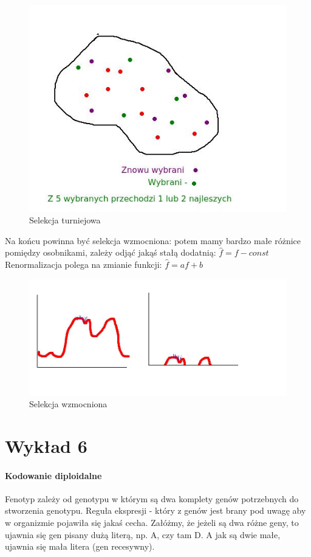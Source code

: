 \documentclass{article}
\begin{document}
				\begin{figure}[ht]
					\label{fig:fig2}
					\centering
					\includegraphics[scale=0.5]{selekcja_turniejowa.jpeg}
					\caption{Selekcja turniejowa}
				\end{figure}
				
			Na końcu powinna być selekcja wzmocniona: potem mamy bardzo małe różnice pomiędzy osobnikami, zależy odjąć jakąś stałą dodatnią: $\hat{f}=f-const$
			Renormalizacja polega na zmianie funkcji: $\hat{f} = af+b$
			
						\begin{figure}[ht]
							\label{fig:fig1}
							\centering
							\includegraphics[scale=0.4]{selekcja_wzmocniona.jpeg}
							\caption{Selekcja wzmocniona}
						\end{figure}
	\section{Wykład 6}
		\paragraph{Kodowanie diploidalne}
		Fenotyp zależy od genotypu w którym są dwa komplety genów potrzebnych do stworzenia genotypu. Reguła ekspresji - który z genów jest brany pod uwagę aby w organizmie pojawiła się jakaś cecha. Załóżmy, że jeżeli są dwa różne geny, to ujawnia się gen pisany dużą literą, np. A, czy tam D. A jak są dwie małe, ujawnia się mała litera (gen recesywny).
		
\end{document}
